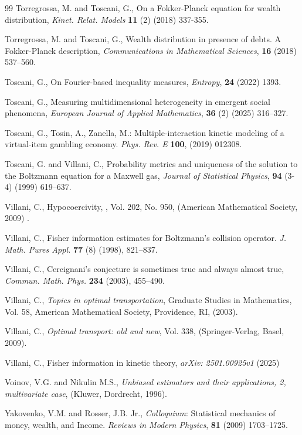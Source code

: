 \documentclass{article}
\begin{document}
\begin{thebibliography}{99}
Torregrossa, M. and Toscani, G., On a Fokker-Planck equation for wealth distribution, \textit{Kinet. Relat. Models} \textbf{11}  (2) (2018) 337-355.

Torregrossa, M. and Toscani, G.,  Wealth distribution in presence of debts. A Fokker-Planck description, \textit{Communications in Mathematical Sciences}, \textbf{16} (2018) 537--560.

Toscani, G.,  On Fourier-based inequality measures, \textit{Entropy}, \textbf{24}  (2022) 1393.

Toscani, G., Measuring multidimensional heterogeneity in emergent social phenomena, \textit{European Journal of Applied Mathematics}, \textbf{36} (2) (2025) 316--327.

Toscani, G., Tosin, A., Zanella, M.:
Multiple-interaction kinetic modeling of a virtual-item gambling economy. \emph{Phys. Rev. E} \textbf{100},    (2019) 012308.

Toscani, G. and Villani, C., Probability metrics and uniqueness of the solution to the Boltzmann equation for a Maxwell gas, \emph{Journal of Statistical Physics}, \textbf{94} (3-4) (1999) 619--637.

Villani, C., Hypocoercivity,  , Vol. 202, No. 950, (American Mathematical Society, 2009) .

Villani, C., Fisher information estimates for Boltzmann’s collision operator. \emph{J. Math. Pures Appl.} \textbf{77} (8) (1998), 821--837.

Villani, C., Cercignani’s conjecture is sometimes true and always almost true, \emph{Commun. Math. Phys.} \textbf{234} (2003), 455--490.

Villani, C., \textit{Topics in optimal transportation}, Graduate Studies in Mathematics, Vol. 58, American Mathematical Society, Providence, RI, (2003).

Villani, C.,
 \textit{Optimal transport: old and new},
  Vol. {338}, (Springer-Verlag, Basel, 2009).

Villani, C.,  Fisher information in kinetic theory, \emph{arXiv: 2501.00925v1} (2025)

Voinov, V.G. and Nikulin M.S., \textit{Unbiased estimators and their applications, 2, multivariate case}, (Kluwer, Dordrecht,  1996).

Yakovenko, V.M. and Rosser, J.B. Jr., \emph{Colloquium}: Statistical mechanics of money, wealth, and Income. \emph{Reviews in Modern Physics}, \textbf{81} (2009) 1703--1725.


\end{thebibliography}
\end{document}
